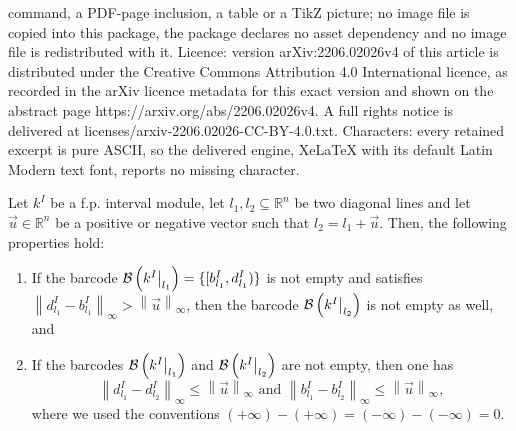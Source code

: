 \documentclass[10pt,a4paper]{amsart}
\DeclareRobustCommand*{\ora}{\overrightarrow}
\newcommand\restr[2]{{  \left.\kern-\nulldelimiterspace #1 \vphantom{\big|} \right|_{#2}  }}
\newcommand{\R}{\mathbb{R}}
\newcommand{\barcode}[1]{ {\mathcal B}\left(#1\right) }
\newcommand{\field}{k}
\newcommand{\norm}[1]{\left\lVert #1 \right\rVert}
\newcommand{\rebuttal}[1]{{ #1}}
\begin{document}
command, a PDF-page inclusion, a table or a TikZ picture; no image file is copied into this package, the package declares no asset dependency and no image file is redistributed with it. Licence: version arXiv:2206.02026v4 of this article is distributed under the Creative Commons Attribution 4.0 International licence, as recorded in the arXiv licence metadata for this exact version and shown on the abstract page https://arxiv.org/abs/2206.02026v4. A full rights notice is delivered at licenses/arxiv-2206.02026-CC-BY-4.0.txt. Characters: every retained excerpt is pure ASCII, so the delivered engine, XeLaTeX with its default Latin Modern text font, reports no missing character.
\begin{lemma}\label{lemma:compatible_close}
	Let $\rebuttal{k^I}$ be a \rebuttal{f.p.} interval module, let $l_1,l_2\subseteq\R^n$ be two diagonal lines and
	let $\ora u\in \R^n$ be a positive or negative vector
	such that $l_2 = l_1 + \ora u$.
	Then, the following properties hold:
	\begin{enumerate}[label=\textnormal{(\textit{\roman*})}]
		\item If the barcode
			$\barcode{\restr{\rebuttal{\field^I}}{l_1}}=\{[b^I_{l_1}, d^I_{l_1})\}$
			is not empty and satisfies $\norm{d^I_{l_1} - b^I_{l_1}}_\infty >
			\norm{\ora u}_\infty$, then the barcode
			$\barcode{\restr{\rebuttal{\field^I}}{l_2}}$ is not empty as well, and
		\item	If the barcodes $\barcode{\restr{\rebuttal{\field^I}}{l_1}}$ and
			$\barcode{\restr{\rebuttal{\field^I}}{l_2}}$ are not empty,
			then one has
			\begin{equation*}
				\norm{ d^I_{l_1}-d^I_{l_2}}_{\infty} \le \norm{ \ora u}_\infty \text{ and } \norm{ b^I_{l_1}-b^I_{l_2}}_\infty \le \norm{ \ora u}_\infty,
			\end{equation*}
			where we used the conventions
			$(+\boldsymbol\infty) - (+\boldsymbol\infty) = (-\boldsymbol\infty) - (-\boldsymbol\infty)  = 0 $.
	\end{enumerate}
\end{lemma}
\end{document}
